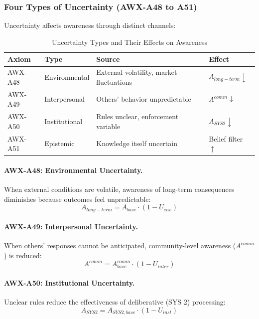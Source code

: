 \subsubsection{Four Types of Uncertainty (AWX-A48 to A51)}

Uncertainty affects awareness through distinct channels:

\begin{table}[htbp]
\centering
\caption{Uncertainty Types and Their Effects on Awareness}
\label{tab:uncertainty-types}
\begin{tabular}{@{}llp{6cm}l@{}}
\toprule
\textbf{Axiom} & \textbf{Type} & \textbf{Source} & \textbf{Effect} \\
\midrule
AWX-A48 & Environmental & External volatility, market fluctuations & $A_{long-term} \downarrow$ \\
AWX-A49 & Interpersonal & Others' behavior unpredictable & $A^{comm} \downarrow$ \\
AWX-A50 & Institutional & Rules unclear, enforcement variable & $A_{SYS2} \downarrow$ \\
AWX-A51 & Epistemic & Knowledge itself uncertain & Belief filter $\uparrow$ \\
\bottomrule
\end{tabular}
\end{table}

\paragraph{AWX-A48: Environmental Uncertainty.}
When external conditions are volatile, awareness of long-term consequences 
diminishes because outcomes feel unpredictable:
\begin{equation}
A_{long-term} = A_{base} \cdot (1 - U_{env})
\end{equation}

\paragraph{AWX-A49: Interpersonal Uncertainty.}
When others' responses cannot be anticipated, community-level awareness 
($A^{comm}$) is reduced:
\begin{equation}
A^{comm} = A^{comm}_{base} \cdot (1 - U_{inter})
\end{equation}

\paragraph{AWX-A50: Institutional Uncertainty.}
Unclear rules reduce the effectiveness of deliberative (SYS 2) processing:
\begin{equation}
A_{SYS2} = A_{SYS2,base} \cdot (1 - U_{inst})
\end{equation}

